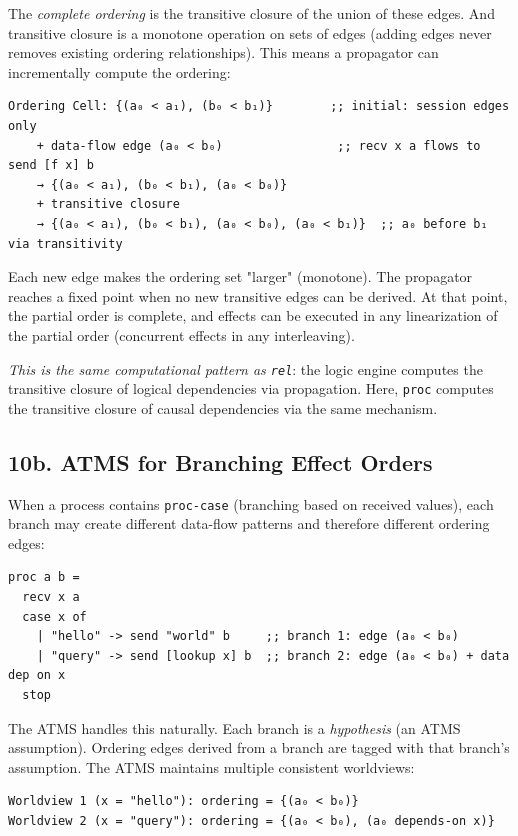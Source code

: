 \documentclass[11pt]{article}
\begin{document}
The \emph{complete ordering} is the transitive closure of the union of these edges.
And transitive closure is a monotone operation on sets of edges (adding edges
never removes existing ordering relationships). This means a propagator can
incrementally compute the ordering:

\begin{verbatim}
Ordering Cell: {(a₀ < a₁), (b₀ < b₁)}        ;; initial: session edges only
    + data-flow edge (a₀ < b₀)                ;; recv x a flows to send [f x] b
    → {(a₀ < a₁), (b₀ < b₁), (a₀ < b₀)}
    + transitive closure
    → {(a₀ < a₁), (b₀ < b₁), (a₀ < b₀), (a₀ < b₁)}  ;; a₀ before b₁ via transitivity
\end{verbatim}

Each new edge makes the ordering set "larger" (monotone). The propagator reaches
a fixed point when no new transitive edges can be derived. At that point, the
partial order is complete, and effects can be executed in any linearization of
the partial order (concurrent effects in any interleaving).

\emph{This is the same computational pattern as \texttt{rel}}: the logic engine computes
the transitive closure of logical dependencies via propagation. Here, \texttt{proc}
computes the transitive closure of causal dependencies via the same mechanism.
\subsection{10b. ATMS for Branching Effect Orders}
\label{sec:org153dd9d}

When a process contains \texttt{proc-case} (branching based on received values), each
branch may create different data-flow patterns and therefore different ordering
edges:

\begin{verbatim}
proc a b =
  recv x a
  case x of
    | "hello" -> send "world" b     ;; branch 1: edge (a₀ < b₀)
    | "query" -> send [lookup x] b  ;; branch 2: edge (a₀ < b₀) + data dep on x
  stop
\end{verbatim}

The ATMS handles this naturally. Each branch is a \emph{hypothesis} (an ATMS
assumption). Ordering edges derived from a branch are tagged with that
branch's assumption. The ATMS maintains multiple consistent worldviews:

\begin{verbatim}
Worldview 1 (x = "hello"): ordering = {(a₀ < b₀)}
Worldview 2 (x = "query"): ordering = {(a₀ < b₀), (a₀ depends-on x)}
\end{verbatim}
\end{document}
